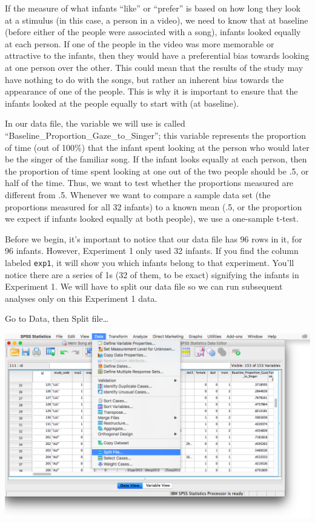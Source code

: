 \documentclass[
]{book}
\begin{document}
If the measure of what infants ``like'' or ``prefer'' is based on how long they look at a stimulus (in this case, a person in a video), we need to know that at baseline (before either of the people were associated with a song), infants looked equally at each person. If one of the people in the video was more memorable or attractive to the infants, then they would have a preferential bias towards looking at one person over the other. This could mean that the results of the study may have nothing to do with the songs, but rather an inherent bias towards the appearance of one of the people. This is why it is important to ensure that the infants looked at the people equally to start with (at baseline).

In our data file, the variable we will use is called ``Baseline\_Proportion\_Gaze\_to\_Singer''; this variable represents the proportion of time (out of 100\%) that the infant spent looking at the person who would later be the singer of the familiar song. If the infant looks equally at each person, then the proportion of time spent looking at one out of the two people should be .5, or half of the time. Thus, we want to test whether the proportions measured are different from .5. Whenever we want to compare a sample data set (the proportions measured for all 32 infants) to a known mean (.5, or the proportion we expect if infants looked equally at both people), we use a one-sample t-test.

Before we begin, it's important to notice that our data file has 96 rows in it, for 96 infants. However, Experiment 1 only used 32 infants. If you find the column labeled \texttt{exp1}, it will show you which infants belong to that experiment. You'll notice there are a series of 1s (32 of them, to be exact) signifying the infants in Experiment 1. We will have to split our data file so we can run subsequent analyses only on this Experiment 1 data.

Go to {Data}, then {Split file\ldots{}}

\includegraphics{img/6.4.12.png}
\end{document}
